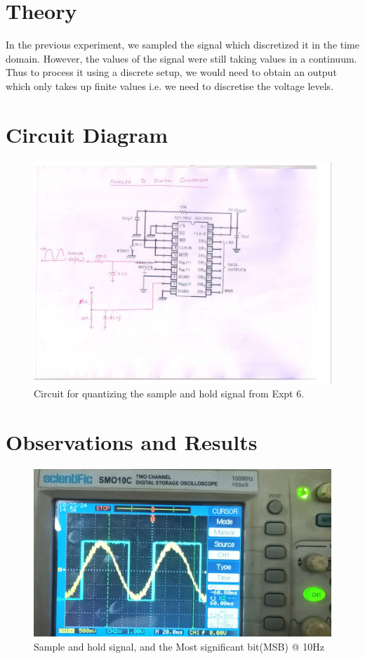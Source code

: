\documentclass{article}
\begin{document}
\section{Theory}
In the previous experiment, we sampled the signal which discretized it in the time domain. However, the values of the signal were still taking values in a continuum. Thus to process it using a discrete setup, we would need to obtain an output which only takes up finite values i.e. we need to discretise the voltage levels. 
\clearpage
\section{Circuit Diagram}
\begin{figure}[!ht]
\includegraphics[width=\textwidth]{Circuit.png}
\caption{Circuit for quantizing the sample and hold signal from Expt 6.}
\label{fig:cir}
\end{figure}
\clearpage
\section{Observations and Results}
\begin{figure}[!ht]
\includegraphics[width=\textwidth]{Sample_and_hold.jpeg}
\caption{Sample and hold signal, and the Most significant bit(MSB) @ 10Hz}
\label{fig:MSB}
\end{figure}
\end{document}
